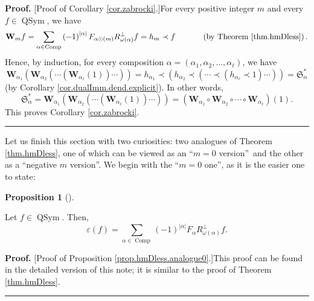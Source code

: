 \documentclass[numbers=enddot,12pt,final,onecolumn,notitlepage,abstracton]{scrartcl}%
\theoremstyle{definition}
\newtheorem{prop}[theo]{Proposition}
\newenvironment{proposition}[1][]
{\begin{prop}[#1]\begin{leftbar}}
{\end{leftbar}\end{prop}}
\newenvironment{proof}[1][Proof]{\noindent\textbf{#1.} }{\ \rule{0.5em}{0.5em}}
\newenvironment{vershort}{}{}
\let\sumnonlimits\sum
\renewcommand{\sum}{\sumnonlimits\limits}
\begin{document}
\begin{proof}
[Proof of Corollary \ref{cor.zabrocki}.]For every positive integer $m$ and
every $f\in\operatorname*{QSym}$, we have%
\[
\mathbf{W}_{m}f=\sum_{\alpha\in\operatorname*{Comp}}\left(  -1\right)
^{\left\vert \alpha\right\vert }F_{\alpha\odot\left(  m\right)  }%
R_{\omega\left(  \alpha\right)  }^{\perp}f=h_{m}\left.  \prec\right.
f\ \ \ \ \ \ \ \ \ \ \left(  \text{by Theorem \ref{thm.hmDless}}\right)  .
\]
Hence, by induction, for every composition $\alpha=\left(  \alpha_{1}%
,\alpha_{2},\ldots,\alpha_{\ell}\right)  $, we have%
\[
\mathbf{W}_{\alpha_{1}}\left(  \mathbf{W}_{\alpha_{2}}\left(  \cdots\left(
\mathbf{W}_{\alpha_{\ell}}\left(  1\right)  \right)  \cdots\right)  \right)
=h_{\alpha_{1}}\left.  \prec\right.  \left(  h_{\alpha_{2}}\left.
\prec\right.  \left(  \cdots\left.  \prec\right.  \left(  h_{\alpha_{\ell}%
}\left.  \prec\right.  1\right)  \cdots\right)  \right)  =\mathfrak{S}%
_{\alpha}^{\ast}%
\]
(by Corollary \ref{cor.dualImm.dend.explicit}). In other words,%
\[
\mathfrak{S}_{\alpha}^{\ast}=\mathbf{W}_{\alpha_{1}}\left(  \mathbf{W}%
_{\alpha_{2}}\left(  \cdots\left(  \mathbf{W}_{\alpha_{\ell}}\left(  1\right)
\right)  \cdots\right)  \right)  =\left(  \mathbf{W}_{\alpha_{1}}%
\circ\mathbf{W}_{\alpha_{2}}\circ\cdots\circ\mathbf{W}_{\alpha_{\ell}}\right)
\left(  1\right)  .
\]
This proves Corollary \ref{cor.zabrocki}.
\end{proof}

Let us finish this section with two curiosities: two analogues of Theorem
\ref{thm.hmDless}, one of which can be viewed as an \textquotedblleft$m=0$
version\textquotedblright\ and the other as a \textquotedblleft negative $m$
version\textquotedblright. We begin with the \textquotedblleft$m=0$
one\textquotedblright, as it is the easier one to state:

\begin{proposition}
\label{prop.hmDless.analogue0}Let $f\in\operatorname*{QSym}$. Then,%
\[
\varepsilon\left(  f\right)  =\sum_{\alpha\in\operatorname*{Comp}}\left(
-1\right)  ^{\left\vert \alpha\right\vert }F_{\alpha}R_{\omega\left(
\alpha\right)  }^{\perp}f.
\]

\end{proposition}

\begin{vershort}
\begin{proof}
[Proof of Proposition \ref{prop.hmDless.analogue0}.]This proof can be found in
the detailed version of this note; it is similar to the proof of Theorem
\ref{thm.hmDless}.
\end{proof}
\end{vershort}
\end{document}
